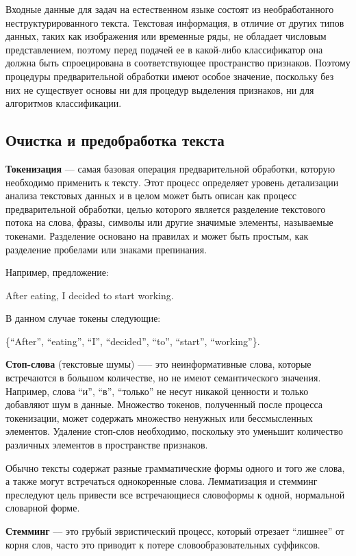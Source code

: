 Входные данные для задач на естественном языке состоят из необработанного неструктурированного текста. Текстовая информация, в отличие от других типов данных, таких как изображения или временные ряды, не обладает числовым представлением, поэтому перед подачей ее в какой-либо классификатор она должна быть спроецирована в соответствующее пространство признаков. Поэтому процедуры предварительной обработки имеют особое значение, поскольку без них не существует основы ни для процедур выделения признаков, ни для алгоритмов классификации.

\subsection{Очистка и предобработка текста}
\textbf{Токенизация} --- самая базовая операция предварительной обработки, которую необходимо применить к тексту. Этот процесс определяет уровень детализации анализа текстовых данных и в целом может быть описан как процесс предварительной обработки, целью которого является разделение текстового потока на слова, фразы, символы или другие значимые элементы, называемые токенами. Разделение основано на правилах и может быть простым, как разделение пробелами или знаками препинания.

Например, предложение:

After eating, I decided to start working.

В данном случае токены следующие:

\{“After”, “eating”, “I”, “decided”, “to”, “start”, “working”\}.

\textbf{Стоп-слова} (текстовые шумы) —-- это неинформативные слова, которые встречаются в большом количестве, но не имеют семантического значения. Например, слова ``и'', ``в'', ``только'' не несут никакой ценности и только добавляют шум в данные. Множество токенов, полученный после процесса токенизации, может содержать множество ненужных или бессмысленных элементов. Удаление стоп-слов необходимо, поскольку это уменьшит количество различных элементов в пространстве признаков. 

Обычно тексты содержат разные грамматические формы одного и того же слова, а также могут встречаться однокоренные слова. Лемматизация и стемминг преследуют цель привести все встречающиеся словоформы к одной, нормальной словарной форме. 

\textbf{Стемминг} –-- это грубый эвристический процесс, который отрезает ``лишнее'' от корня слов, часто это приводит к потере словообразовательных суффиксов. 

